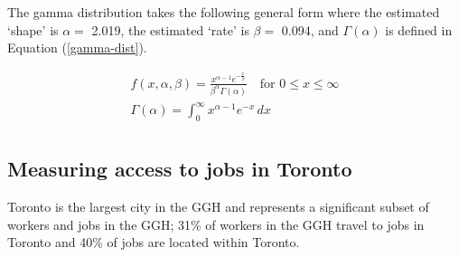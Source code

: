 \documentclass[]{elsarticle} %
\begin{document}
The gamma distribution takes the following general form where the
estimated `shape' is \(\alpha=\) 2.019, the estimated `rate' is
\(\beta =\) 0.094, and \(\Gamma(\alpha)\) is defined in Equation
(\ref{gamma-dist}).

\begin{equation}
\label{gamma-dist}
\begin{array}{l} 
f(x, \alpha, \beta) = \frac {x^{\alpha-1}e^{-\frac{x}{\beta}}}{ \beta^{\alpha}\Gamma(\alpha)} \quad \text{for } 0 \leq x \leq \infty\\

\Gamma(\alpha) =  \int_{0}^{\infty} x^{\alpha-1}e^{-x} \,dx\\
\end{array}
\end{equation}

\hypertarget{measuring-access-to-jobs-in-toronto}{%
\subsection{Measuring access to jobs in
Toronto}\label{measuring-access-to-jobs-in-toronto}}

Toronto is the largest city in the GGH and represents a significant
subset of workers and jobs in the GGH; 31\% of workers in the GGH travel
to jobs in Toronto and 40\% of jobs are located within Toronto.
\end{document}
